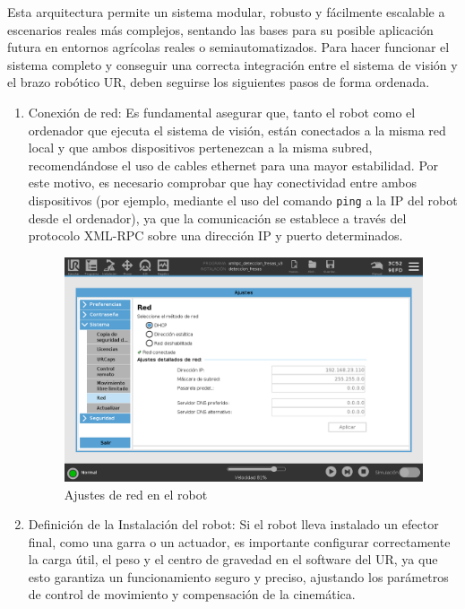 Esta arquitectura permite un sistema modular, robusto y fácilmente escalable a escenarios reales más complejos, sentando las bases para su posible aplicación futura en entornos agrícolas reales o semiautomatizados. Para hacer funcionar el sistema completo y conseguir una correcta integración entre el sistema de visión y el brazo robótico UR, deben seguirse los siguientes pasos de forma ordenada.

\begin{enumerate}
  \item Conexión de red: Es fundamental asegurar que, tanto el robot como el ordenador que ejecuta el sistema de visión, están conectados a la misma red local y que ambos dispositivos pertenezcan a la misma subred, recomendándose el uso de cables ethernet para una mayor estabilidad. Por este motivo, es necesario comprobar que hay conectividad entre ambos dispositivos (por ejemplo, mediante el uso del comando \texttt{ping} a la IP del robot desde el ordenador), ya que la comunicación se establece a través del protocolo XML-RPC sobre una dirección IP y puerto determinados.
    
      \begin{figure} [H]
        \begin{center}
          \includegraphics[width=155mm]{figs/Ajustes de Red UR.png}
        \end{center}
        \caption{Ajustes de red en el robot}
        \label{fig:ajustes_red_UR}
      \end{figure} 
  
  \item Definición de la Instalación del robot: Si el robot lleva instalado un efector final, como una garra o un actuador, es importante configurar correctamente la carga útil, el peso y el centro de gravedad en el software del UR, ya que esto garantiza un funcionamiento seguro y preciso, ajustando los parámetros de control de movimiento y compensación de la cinemática.
  

\end{enumerate}
